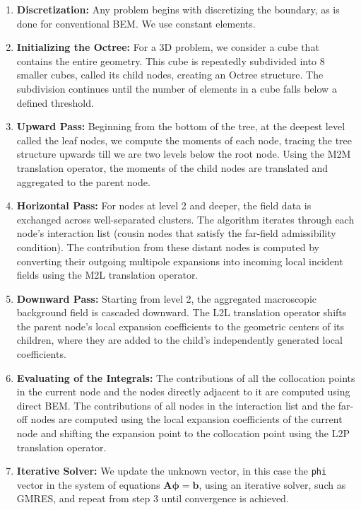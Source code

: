 \begin{enumerate}[label=\textbf{Step \arabic*.}, leftmargin=*]
    \item \textbf{Discretization:} Any problem begins with discretizing the boundary, as is done for conventional \ac{BEM}. We use constant elements.
    \item \textbf{Initializing the Octree:} For a 3D problem, we consider a cube that contains the entire geometry. This cube is repeatedly subdivided into 8 smaller cubes, called its child nodes, creating an Octree structure. The subdivision continues until the number of elements in a cube falls below a defined threshold.
    \item \textbf{Upward Pass:} Beginning from the bottom of the tree, at the deepest level called the leaf nodes, we compute the moments of each node, tracing the tree structure upwards till we are two levels below the root node. Using the \ac{M2M} translation operator, the moments of the child nodes are translated and aggregated to the parent node.
    \item \textbf{Horizontal Pass:} For nodes at level 2 and deeper, the field data is exchanged across well-separated clusters. The algorithm iterates through each node's interaction list (cousin nodes that satisfy the far-field admissibility condition). The contribution from these distant nodes is computed by converting their outgoing multipole expansions into incoming local incident fields using the M2L translation operator.
    \item \textbf{Downward Pass:} Starting from level 2, the aggregated macroscopic background field is cascaded downward. The L2L translation operator shifts the parent node's local expansion coefficients to the geometric centers of its children, where they are added to the child's independently generated local coefficients.
    \item \textbf{Evaluating of the Integrals:} The contributions of all the collocation points in the current node and the nodes directly adjacent to it are computed using direct \ac{BEM}. The contributions of all nodes in the interaction list and the far-off nodes are computed using the local expansion coefficients of the current node and shifting the expansion point to the collocation point using the \ac{L2P} translation operator.
    \item \textbf{Iterative Solver:} We update the unknown vector, in this case the \texttt{phi} vector in the system of equations $\mathbf{A} \boldsymbol{\phi} = \mathbf{b}$, using an iterative solver, such as \ac{GMRES}, and repeat from step 3 until convergence is achieved.
\end{enumerate}





